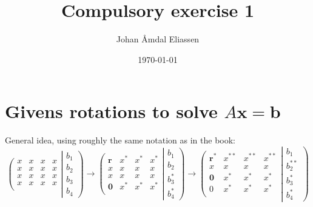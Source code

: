 \documentclass[11pt]{amsart}
\theoremstyle{definition}
\numberwithin{equation}{section}
\begin{document}
\title[MAT-INF4130]{Compulsory exercise 1}

\author{Johan Åmdal Eliassen}

\maketitle
{}

\date{\today}
\keywords{}

\section{Givens rotations to solve $A\mathbf{x}= \mathbf{b}$}
General idea, using roughly the same notation as in the book:
\begin{equation*}\left(
\begin{matrix}
x&x&x&x \\
x&x&x&x \\
x&x&x&x \\
x&x&x&x \\
\end{matrix}
\right.
\left|
\begin{matrix}
b_1 \\
b_2 \\
b_3 \\
b_4
\end{matrix}
\right)
\rightarrow
\left(
\begin{matrix}
\mathbf{r}&x^*&x^*&x^* \\
x&x&x&x \\
x&x&x&x \\
\mathbf{0}&x^*&x^*&x^* \\
\end{matrix}
\right.
\left|
\begin{matrix}
b_1 \\
b_2 \\
b_3^* \\
b_4^*
\end{matrix}
\right)
\rightarrow
\left(
\begin{matrix}
\mathbf{r}^*&x^{**}&x^{**}&x^{**}\\
x&x&x&x \\
\mathbf{0}&x^*&x^*&x^* \\
0&x^*&x^*&x^* \\
\end{matrix}
\right.
\left|
\begin{matrix}
b_1 \\
b_2^{**} \\
b_3^* \\
b_4^*
\end{matrix}
\right)
\end{equation*}
\end{document}
